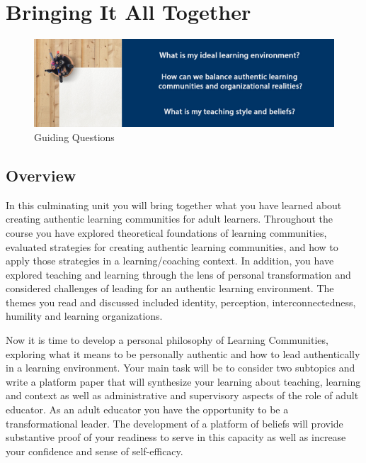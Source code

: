 \documentclass[
]{book}
\begin{document}
\hypertarget{bringing-it-all-together}{%
\chapter{Bringing It All Together}\label{bringing-it-all-together}}

\begin{figure}
\centering
\includegraphics{assets/unit10/BannerUnit10.jpg}
\caption{Guiding Questions}
\end{figure}

\hypertarget{overview-9}{%
\section*{Overview}\label{overview-9}}

In this culminating unit you will bring together what you have learned about creating authentic learning communities for adult learners. Throughout the course you have explored theoretical foundations of learning communities, evaluated strategies for creating authentic learning communities, and how to apply those strategies in a learning/coaching context. In addition, you have explored teaching and learning through the lens of personal transformation and considered challenges of leading for an authentic learning environment. The themes you read and discussed included identity, perception, interconnectedness, humility and learning organizations.

Now it is time to develop a personal philosophy of Learning Communities, exploring what it means to be personally authentic and how to lead authentically in a learning environment. Your main task will be to consider two subtopics and write a platform paper that will synthesize your learning about teaching, learning and context as well as administrative and supervisory aspects of the role of adult educator. As an adult educator you have the opportunity to be a transformational leader. The development of a platform of beliefs will provide substantive proof of your readiness to serve in this capacity as well as increase your confidence and sense of self-efficacy.
\end{document}
